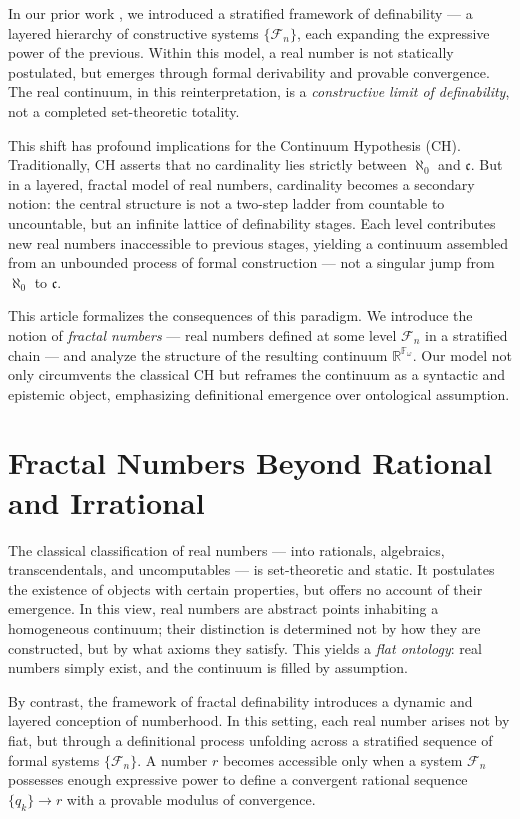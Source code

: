\documentclass[12pt]{article}
\theoremstyle{definition}
\theoremstyle{plain}
\theoremstyle{remark}
\begin{document}
In our prior work \cite{Semenov2025FractalOrigin, Semenov2025FractalAnalysis}, we introduced a stratified framework of definability — a layered hierarchy of constructive systems \( \{ \mathcal{F}_n \} \), each expanding the expressive power of the previous. Within this model, a real number is not statically postulated, but emerges through formal derivability and provable convergence. The real continuum, in this reinterpretation, is a \emph{constructive limit of definability}, not a completed set-theoretic totality.

This shift has profound implications for the Continuum Hypothesis (CH). Traditionally, CH asserts that no cardinality lies strictly between \( \aleph_0 \) and \( \mathfrak{c} \). But in a layered, fractal model of real numbers, cardinality becomes a secondary notion: the central structure is not a two-step ladder from countable to uncountable, but an infinite lattice of definability stages. Each level contributes new real numbers inaccessible to previous stages, yielding a continuum assembled from an unbounded process of formal construction — not a singular jump from \( \aleph_0 \) to \( \mathfrak{c} \).

This article formalizes the consequences of this paradigm. We introduce the notion of \emph{fractal numbers} — real numbers defined at some level \( \mathcal{F}_n \) in a stratified chain — and analyze the structure of the resulting continuum \( \mathbb{R}^{\mathbb{F}_\omega} \). Our model not only circumvents the classical CH but reframes the continuum as a syntactic and epistemic object, emphasizing definitional emergence over ontological assumption.

\section{Fractal Numbers Beyond Rational and Irrational}

The classical classification of real numbers — into rationals, algebraics, transcendentals, and uncomputables — is set-theoretic and static. It postulates the existence of objects with certain properties, but offers no account of their emergence. In this view, real numbers are abstract points inhabiting a homogeneous continuum; their distinction is determined not by how they are constructed, but by what axioms they satisfy. This yields a \emph{flat ontology}: real numbers simply exist, and the continuum is filled by assumption.

By contrast, the framework of fractal definability introduces a dynamic and layered conception of numberhood. In this setting, each real number arises not by fiat, but through a definitional process unfolding across a stratified sequence of formal systems \( \{ \mathcal{F}_n \} \). A number \( r \) becomes accessible only when a system \( \mathcal{F}_n \) possesses enough expressive power to define a convergent rational sequence \( \{q_k\} \to r \) with a provable modulus of convergence.
\end{document}
